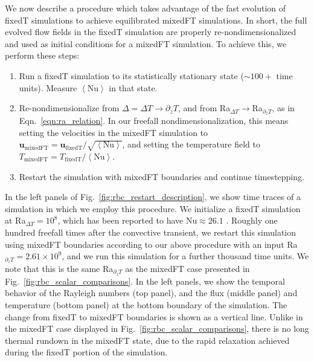 \documentclass[aps, pre, onecolumn, nofootinbib, notitlepage, groupedaddress, amsfonts, amssymb, amsmath, longbibliography, superscriptaddress]{revtex4-1}
\newcommand{\angles}[1]{\ensuremath{\left\langle #1 \right\rangle}}
\begin{document}
We now describe a procedure which takes advantage of the fast evolution of fixedT simulations to achieve equilibrated mixedFT simulations.
In short, the full evolved flow fields in the fixedT simulation are properly re-nondimensionalized and used as initial conditions for a mixedFT simulation.
To achieve this, we perform these steps:
\begin{enumerate}
\item Run a fixedT simulation to its statistically stationary state ($\sim100+$ time units). 
Measure $\angles{\text{Nu}}$ in that state.
\item Re-nondimensionalize from $\Delta = \Delta T \rightarrow \partial_z T$, and from Ra$_{\Delta T}\rightarrow$Ra$_{\partial_z T}$, as in Eqn.~\ref{eqn:ra_relation}.
In our freefall nondimensionalization, this means setting the velocities in the mixedFT simulation to $\bm{u}_{\text{mixedFT}} = \bm{u}_{\text{fixedT}} / \sqrt{\angles{\text{Nu}}}$, and setting the temperature field to $T_{\text{mixedFT}} = T_{\text{fixedT}} / \angles{\text{Nu}}$.
\item Restart the simulation with mixedFT boundaries and continue timestepping.
\end{enumerate}
In the left panels of Fig.~\ref{fig:rbc_restart_description}, we show time traces of a simulation in which we employ this procedure.
We initialize a fixedT simulation at Ra$_{\Delta T} = 10^8$, which has been reported to have $\text{Nu} \approx 26.1$ \cite{zhu&all2018}.
Roughly one hundred freefall times after the convective transient, we restart this simulation using mixedFT boundaries according to our above procedure with an input Ra$_{\partial_z T} = 2.61 \times 10^9$, and we run this simulation for a further thousand time units.
We note that this is the same Ra$_{\partial_z T}$ as the mixedFT case presented in Fig.~\ref{fig:rbc_scalar_comparisons}.
In the left panels, we show the temporal behavior of the Rayleigh numbers (top panel), and the flux (middle panel) and temperature (bottom panel) at the bottom boundary of the simulation.
The change from fixedT to mixedFT boundaries is shown as a vertical line.
Unlike in the mixedFT case displayed in Fig.~\ref{fig:rbc_scalar_comparisons}, there is no long thermal rundown in the mixedFT state, due to the rapid relaxation achieved during the fixedT portion of the simulation.
\end{document}
